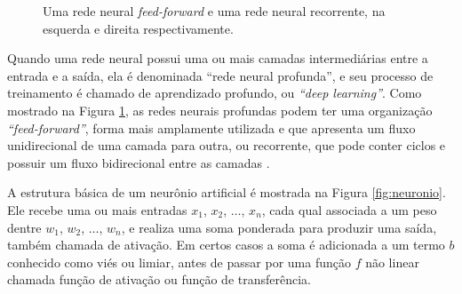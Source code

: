 \documentclass[
	12pt,				%
	openright,			%
	oneside,			%
	a4paper,			%
	tccpreliminar,			%
	]{ABNT-DC-UEL}
\begin{document}
\begin{figure}[hbt]
\begin{subfigure}{.49\textwidth}
{}
    \end{subfigure}    
    \caption{Uma rede neural \textit{feed-forward} e uma rede neural recorrente, na esquerda e direita respectivamente.}
    \label{fig:ann}
\end{figure}

Quando uma rede neural possui uma ou mais camadas intermediárias entre a entrada e a saída, ela é denominada ``rede neural profunda'', e seu processo de treinamento é chamado de aprendizado profundo, ou \textit{``deep learning''}. Como mostrado na Figura \ref{fig:ann}, as redes neurais profundas podem ter uma organização \textit{``feed-forward''}, forma mais amplamente utilizada e que apresenta um fluxo unidirecional de uma camada para outra, ou recorrente, que pode conter ciclos e possuir um fluxo bidirecional entre as camadas \cite{mathew:21}.

A estrutura básica de um neurônio artificial é mostrada na Figura \ref{fig:neuronio}. Ele recebe uma ou mais entradas $x_1$, $x_2$, $\dots$, $x_n$, cada qual associada a um peso dentre $w_1$, $w_2$, $\dots$, $w_n$, e realiza uma soma ponderada para produzir uma saída, também chamada de ativação. Em certos casos a soma é adicionada a um termo $b$ conhecido como viés ou limiar, antes de passar por uma função $f$ não linear chamada função de ativação ou função de transferência. 
\end{document}
